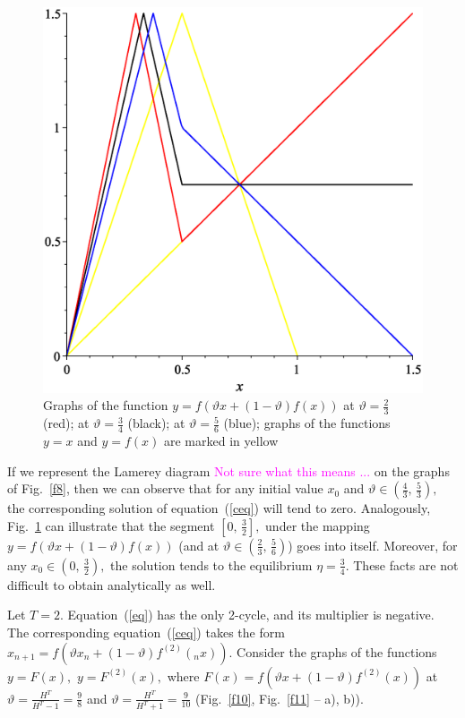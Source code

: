 \documentclass[12pt,a4paper]{amsart}
\begin{document}
\begin{figure}[h!]
\centering
\includegraphics[scale=0.28]{Fig9}
\caption{Graphs of the function $y = f \left( \vartheta x + (1 - \vartheta)f(x) \right)$ at $\vartheta=\frac23$ (red);
at $\vartheta=\frac34$ (black); at $\vartheta=\frac56$ (blue); graphs of the functions $y=x$ and $y=f(x)$ 
are marked in yellow} \label{f9}
\end{figure}

If we represent the Lamerey diagram \textcolor{magenta}{Not sure what this means ... } on the graphs of Fig.~\ref{f8}, then we can observe that for any initial value $x_0$ 
and $\vartheta \in \left(\frac43,\,\frac53\right),$ the corresponding solution of equation~(\ref{ceq}) will tend to zero. 
Analogously, Fig.~\ref{f9} can illustrate that the segment $\left[ 0,\,\frac32\right],$ under the mapping  
$y = f \left( \vartheta x + (1 - \vartheta)f(x) \right)$ (and at $\vartheta \in \left(\frac23,\,\frac56\right)$) goes into itself.
Moreover, for any $x_0 \in \left(0,\,\frac32\right),$ the solution tends to the equilibrium $\eta = \frac34.$ These facts are 
not difficult to obtain analytically as well.

Let $T=2.$ Equation~(\ref{eq}) has the only 2-cycle, and its multiplier is negative. The corresponding equation~(\ref{ceq}) 
takes the form $x_{n+1} = f \left( \vartheta x_n + (1 - \vartheta)f^{(2)}(_nx) \right).$ Consider the graphs of the functions 
$y=F(x),$ $y=F^{(2)}(x),$ where $F(x) = f \left( \vartheta x + (1 - \vartheta)f^{(2)}(x) \right)$ at 
$\vartheta = \frac{H^T}{H^T-1} = \frac98$ and $\vartheta = \frac{H^T}{H^T+1} = \frac{9}{10}$ 
(Fig.~\ref{f10}, Fig.~\ref{f11} -- a), b)).
\end{document}
